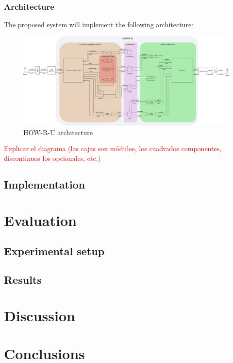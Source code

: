 \documentclass[12pt,english]{article}
\begin{document}
\subsubsection{Architecture}
The proposed system will implement the following architecture:
\begin{figure}[H]
  \centering
  \includegraphics[width=\textwidth]{architecture.jpg}
  \caption{HOW-R-U architecture}
\end{figure}
\textcolor{red}{Explicar el diagrama (las cajas son módulos, los cuadrados componentes, discontinuos los opcionales, etc.)}



\subsection{Implementation}


\section{Evaluation}

\subsection{Experimental setup}

\subsection{Results}


\section{Discussion}

\section{Conclusions}

\newpage


\doclicenseThis
\end{document}
